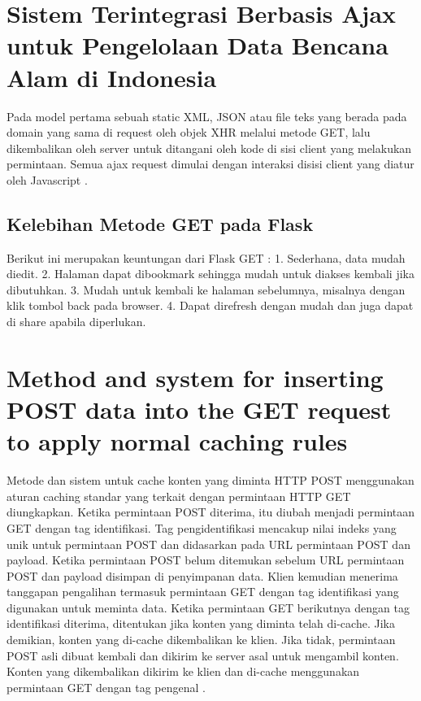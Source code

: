 \section{Sistem Terintegrasi Berbasis Ajax untuk Pengelolaan Data Bencana Alam di Indonesia}
Pada model pertama sebuah static XML, JSON atau file teks yang berada pada domain yang sama di request oleh objek XHR melalui metode GET, lalu dikembalikan oleh server untuk ditangani oleh kode di sisi client yang melakukan permintaan. Semua ajax request dimulai dengan interaksi disisi client yang diatur oleh Javascript \cite{prasetyo2007sistem}.

\subsection{Kelebihan Metode GET pada Flask}
Berikut ini merupakan keuntungan dari Flask GET :
1. Sederhana, data mudah diedit.
2. Halaman dapat dibookmark sehingga mudah untuk diakses kembali jika dibutuhkan.
3. Mudah untuk kembali ke halaman sebelumnya, misalnya dengan klik tombol back pada browser.
4. Dapat direfresh dengan mudah dan juga dapat di share apabila diperlukan.
\cite{lokhande2015efficient} 

\section{Method and system for inserting POST data into the GET request to apply normal caching rules}
Metode dan sistem untuk cache konten yang diminta HTTP POST menggunakan aturan caching standar yang terkait dengan permintaan HTTP GET diungkapkan. Ketika permintaan POST diterima, itu diubah menjadi permintaan GET dengan tag identifikasi. Tag pengidentifikasi mencakup nilai indeks yang unik untuk permintaan POST dan didasarkan pada URL permintaan POST dan payload. Ketika permintaan POST belum ditemukan sebelum URL permintaan POST dan payload disimpan di penyimpanan data. Klien kemudian menerima tanggapan pengalihan termasuk permintaan GET dengan tag identifikasi yang digunakan untuk meminta data. Ketika permintaan GET berikutnya dengan tag identifikasi diterima, ditentukan jika konten yang diminta telah di-cache. Jika demikian, konten yang di-cache dikembalikan ke klien. Jika tidak, permintaan POST asli dibuat kembali dan dikirim ke server asal untuk mengambil konten. Konten yang dikembalikan dikirim ke klien dan di-cache menggunakan permintaan GET dengan tag pengenal \cite{sloat2009method}. 